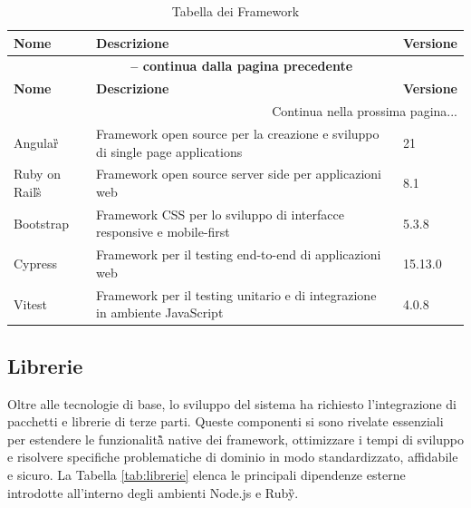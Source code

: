 \documentclass[a4paper,11pt]{article}
\begin{document}
\begin{longtable}{|p{2cm}|p{7cm}|p{3cm}|}
\caption{Tabella dei Framework}\label{tab:framework}\\
\hline
\rowcolor{primaryblue!40}
\textbf{Nome} & \textbf{Descrizione} & \textbf{Versione} \\
\hline
\endfirsthead

\multicolumn{3}{c}{{\bfseries \tablename\ \thetable{} -- continua dalla pagina precedente}}\\
\hline
\rowcolor{primaryblue!40}
\textbf{Nome} & \textbf{Descrizione} & \textbf{Versione} \\
\hline
\endhead

\hline
\multicolumn{3}{|r|}{{Continua nella prossima pagina...}}\\
\hline
\endfoot

\hline
\endlastfoot
Angular\G{} & Framework open source per la creazione e sviluppo di single page applications & 21 \\
\hline
Ruby on Rails\G{} & Framework open source server side per applicazioni web & 8.1 \\
\hline
Bootstrap & Framework CSS per lo sviluppo di interfacce responsive e mobile-first & 5.3.8 \\
\hline
Cypress & Framework per il testing end-to-end di applicazioni web & 15.13.0 \\
\hline
Vitest & Framework per il testing unitario e di integrazione in ambiente JavaScript & 4.0.8 \\
\end{longtable}


\subsection{Librerie}
Oltre alle tecnologie di base, lo sviluppo del sistema ha richiesto l'integrazione di pacchetti e librerie di terze parti. Queste componenti si sono rivelate essenziali per estendere le funzionalità\G{} native dei framework, ottimizzare i tempi di sviluppo e risolvere specifiche problematiche di dominio in modo standardizzato, affidabile e sicuro. La Tabella \ref{tab:librerie} elenca le principali dipendenze esterne introdotte all'interno degli ambienti Node.js e Ruby\G{}.
\end{document}
